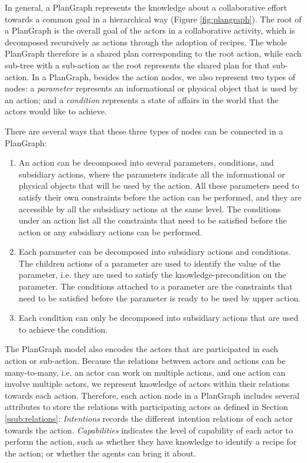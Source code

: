In general, a PlanGraph represents the knowledge about a collaborative effort towards a common goal in a hierarchical way (Figure \ref{fig:plangraph}). The root of a PlanGraph is the overall goal of the actors in a collaborative activity, which is decomposed recursively as actions through the adoption of recipes. The whole PlanGraph therefore is a shared plan corresponding to the root action, while each sub-tree with a sub-action as the root represents the shared plan for that sub-action. In a PlanGraph, besides the action nodes, we also represent two types of nodes: a \emph{parameter} represents an informational or physical object that is used by an action; and a \emph{condition} represents a state of affairs in the world that the actors would like to achieve. 

There are several ways that these three types of nodes can be connected in a PlanGraph:
\begin{enumerate}
	\item An action can be decomposed into several parameters, conditions, and subsidiary actions, where the parameters indicate all the informational or physical objects that will be used by the action. All these parameters need to satisfy their own constraints before the action can be performed, and they are accessible by all the subsidiary actions at the same level. The conditions under an action list all the constraints that need to be satisfied before the action or any subsidiary actions can be performed.  
	\item Each parameter can be decomposed into subsidiary actions and conditions. The children actions of a parameter are used to identify the value of the parameter, i.e. they are used to satisfy the knowledge-precondition on the parameter. The conditions attached to a parameter are the constraints that need to be satisfied before the parameter is ready to be used by upper action.
	\item Each condition can only be decomposed into subsidiary actions that are used to achieve the condition.
\end{enumerate}

The PlanGraph model also encodes the actors that are participated in each action or sub-action. Because the relations between actors and actions can be many-to-many, i.e. an actor can work on multiple actions, and one action can involve multiple actors, we represent knowledge of actors within their relations towards each action. Therefore, each action node in a PlanGraph includes several attributes to store the relations with participating actors as defined in Section \ref{ssub:relations}: \emph{Intentions} records the different intention relations of each actor towards the action. \emph{Capabilities} indicates the level of capability of each actor to perform the action, such as whether they have knowledge to identify a recipe for the action; or whether the agents can bring it about.

